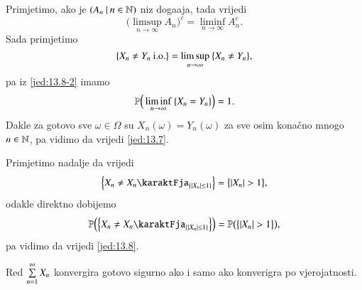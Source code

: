 \begin{nap} \label{nap:13.8-1}
    Primjetimo, ako je $({A_n} \: | \: {n \in \mathbb{N}})$ niz doga\dj aja, tada vrijedi
    \begin{equation}    \label{jed:13.8-2}
        \Big( \limsup\limits_{n \to \infty} A_n \Big)^c = \liminf\limits_{n \to \infty} A_n^c.
    \end{equation}
    Sada primjetimo
    \begin{equation*}
        \{ X_n \neq Y_n \: \mathrm{i.o.} \} = \limsup\limits_{n \to \infty} \: \{ X_n \neq Y_n \},
    \end{equation*}
    pa iz \eqref{jed:13.8-2} imamo
    \begin{equation*}
        \mathbb{P} \Big( \liminf\limits_{n \to \infty} \: \{ X_n = Y_n \} \Big) = 1.
    \end{equation*}
    Dakle za gotovo sve $\omega \in \Omega$ su $X_n (\omega) = Y_n (\omega)$ za sve osim kona\v cno mnogo $n \in \mathbb{N}$, pa vidimo da vrijedi \eqref{jed:13.7}.

    Primjetimo nadalje da vrijedi
    \begin{equation*}
        \Big\{ X_n \neq X_n \karaktFja_{\{ |X_n| \leq 1 \}} \Big\} = \big\{ |X_n| > 1 \big\},
    \end{equation*}
    odakle direktno dobijemo
    \begin{equation*}
        \masP \Big( \Big\{ X_n \neq X_n \karaktFja_{\{ |X_n| \leq 1 \}} \Big\} \Big) = \masP \big( \big\{ |X_n| > 1 \big\} \big),
    \end{equation*}
    pa vidimo da vrijedi \eqref{jed:13.8}.
\end{nap}

\begin{tm}[P. L\' evy]  \label{tm:13.9}
    Red $\sum\limits_{n = 1}^{\infty} X_n$ konvergira gotovo sigurno ako i samo ako konverigra po vjerojatnosti.
\end{tm}

